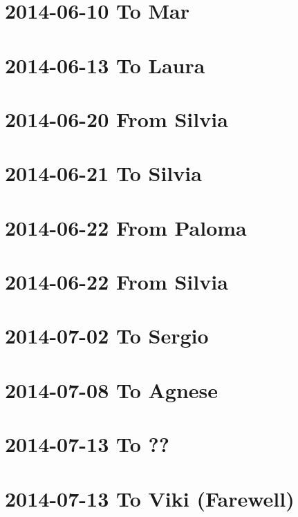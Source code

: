 \documentclass[]{book}
\begin{document}
\hypertarget{to-mar}{%
\section{2014-06-10 To Mar}\label{to-mar}}

\hypertarget{to-laura-2}{%
\section{2014-06-13 To Laura}\label{to-laura-2}}

\hypertarget{from-silvia-1}{%
\section{2014-06-20 From Silvia}\label{from-silvia-1}}

\hypertarget{to-silvia}{%
\section{2014-06-21 To Silvia}\label{to-silvia}}

\hypertarget{from-paloma-3}{%
\section{2014-06-22 From Paloma}\label{from-paloma-3}}

\hypertarget{from-silvia-2}{%
\section{2014-06-22 From Silvia}\label{from-silvia-2}}

\hypertarget{to-sergio-2}{%
\section{2014-07-02 To Sergio}\label{to-sergio-2}}

\hypertarget{to-agnese}{%
\section{2014-07-08 To Agnese}\label{to-agnese}}

\hypertarget{to-1}{%
\section{2014-07-13 To ??}\label{to-1}}

\hypertarget{to-viki-farewell}{%
\section{2014-07-13 To Viki (Farewell)}\label{to-viki-farewell}}
\end{document}
